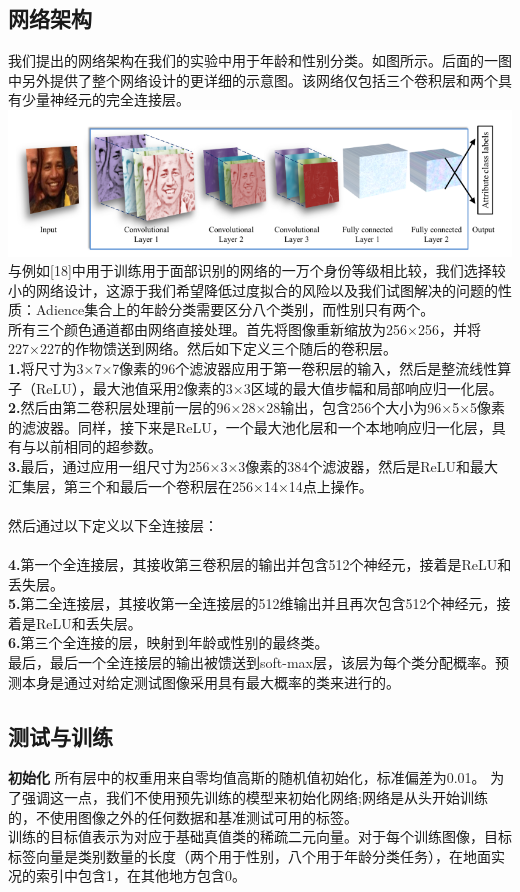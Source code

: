 \documentclass{article}
\begin{document}
\subsection{网络架构}
我们提出的网络架构在我们的实验中用于年龄和性别分类。如图所示。后面的一图中另外提供了整个网络设计的更详细的示意图。该网络仅包括三个卷积层和两个具有少量神经元的完全连接层。\\
\includegraphics[width=\textwidth]{figure_2.png}
与例如[18]中用于训练用于面部识别的网络的一万个身份等级相比较，我们选择较小的网络设计，这源于我们希望降低过度拟合的风险以及我们试图解决的问题的性质：Adience集合上的年龄分类需要区分八个类别，而性别只有两个。\\
所有三个颜色通道都由网络直接处理。首先将图像重新缩放为256×256，并将227×227的作物馈送到网络。然后如下定义三个随后的卷积层。\\
\textbf{1.}将尺寸为3×7×7像素的96个滤波器应用于第一卷积层的输入，然后是整流线性算子（ReLU），最大池值采用2像素的3×3区域的最大值步幅和局部响应归一化层。\\
\textbf{2.}然后由第二卷积层处理前一层的96×28×28输出，包含256个大小为96×5×5像素的滤波器。同样，接下来是ReLU，一个最大池化层和一个本地响应归一化层，具有与以前相同的超参数。\\
\textbf{3.}最后，通过应用一组尺寸为256×3×3像素的384个滤波器，然后是ReLU和最大汇集层，第三个和最后一个卷积层在256×14×14点上操作。\\\\
然后通过以下定义以下全连接层：\\\\
\textbf{4.}第一个全连接层，其接收第三卷积层的输出并包含512个神经元，接着是ReLU和丢失层。\\
\textbf{5.}第二全连接层，其接收第一全连接层的512维输出​​并且再次包含512个神经元，接着是ReLU和丢失层。\\
\textbf{6.}第三个全连接的层，映射到年龄或性别的最终类。\\
最后，最后一个全连接层的输出被馈送到soft-max层，该层为每个类分配概率。预测本身是通过对给定测试图像采用具有最大概率的类来进行的。\\

\subsection{测试与训练}
\textbf{初始化}
所有层中的权重用来自零均值高斯的随机值初始化，标准偏差为0.01。
为了强调这一点，我们不使用预先训练的模型来初始化网络;网络是从头开始训练的，不使用图像之外的任何数据和基准测试可用的标签。\\
训练的目标值表示为对应于基础真值类的稀疏二元向量。对于每个训练图像，目标标签向量是类别数量的长度（两个用于性别，八个用于年龄分类任务），在地面实况的索引中包含1，在其他地方包含0。\\
\end{document}
